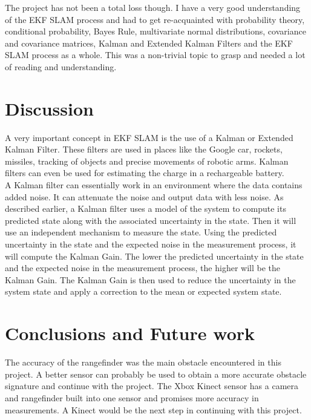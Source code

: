\documentclass[conference]{IEEEtran}
\begin{document}
The project has not been a total loss though. I have a very good understanding of the EKF SLAM process and had to get re-acquainted with probability theory, conditional probability, Bayes Rule, multivariate normal distributions, covariance and covariance matrices, Kalman and Extended Kalman Filters and the EKF SLAM process as a whole. This was a non-trivial topic to grasp and needed a lot of reading and understanding.

\section{Discussion}

A very important concept in EKF SLAM is the use of a Kalman or Extended Kalman Filter. These filters are used in places like the Google car, rockets, missiles, tracking of objects and precise movements of robotic arms. Kalman filters can even be used for estimating the charge in a rechargeable battery.\\

A Kalman filter can essentially work in an environment where the data contains added noise. It can attenuate the noise and output data with less noise. As described earlier, a Kalman filter uses a model of the system to compute its predicted state along with the associated uncertainty in the state. Then it will use an independent mechanism to measure the state. Using 
the predicted uncertainty in the state and the expected noise in the measurement process, it will compute the Kalman Gain. The lower the predicted uncertainty in the state and the expected noise in the measurement process, the higher will be the Kalman Gain. The Kalman Gain is then used to reduce the uncertainty in the system state and apply a correction to the mean or expected system state.

\section{Conclusions and Future work}
The accuracy of the rangefinder was the main obstacle encountered in this project. A better sensor can probably be used to obtain a more accurate obstacle signature and continue with the project. The Xbox Kinect sensor has a camera and rangefinder built into one sensor and promises more accuracy in measurements. A Kinect would be the next step in continuing with this project.
\end{document}
